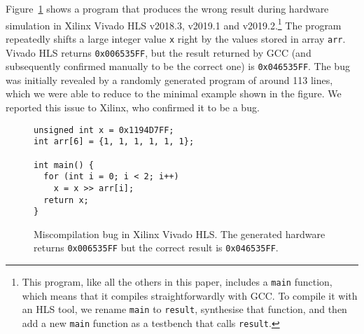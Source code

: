 \begin{example}
\label{ex:vivado_miscomp}
Figure~\ref{fig:vivado_bug1} shows a program that produces the wrong result
during hardware simulation in Xilinx Vivado HLS v2018.3, v2019.1 and
v2019.2.\footnote{This program, like all the others in this paper, includes a
  \texttt{main} function, which means that it compiles straightforwardly with
  GCC. To compile it with an HLS tool, we rename \texttt{main} to
  \texttt{result}, synthesise that function, and then add a new \texttt{main}
  function as a testbench that calls \texttt{result}.} The program repeatedly
shifts a large integer value \texttt{x} right by the values stored in array
\texttt{arr}.  Vivado HLS returns \texttt{0x006535FF}, but the result returned
by GCC (and subsequently confirmed manually to be the correct one) is
\texttt{0x046535FF}. The bug was initially revealed by a randomly generated
program of around 113 lines, which we were able to reduce to the minimal example
shown in the figure.  We reported this issue to Xilinx, who confirmed it to be a
bug.
\end{example}

\begin{figure}
\centering
\begin{minipage}{6cm}
\begin{verbatim}
unsigned int x = 0x1194D7FF;
int arr[6] = {1, 1, 1, 1, 1, 1};

int main() {
  for (int i = 0; i < 2; i++)
    x = x >> arr[i];
  return x;
}
\end{verbatim}
\end{minipage}
\caption[Miscompilation bug in Xilinx Vivado HLS v2018.3, v2019.1 and
v2019.2.]{Miscompilation bug in Xilinx Vivado HLS. The generated hardware
  returns \texttt{0x006535FF} but the correct result is \texttt{0x046535FF}.}%
\label{fig:vivado_bug1}
\end{figure}

\def\totaltestcases{6700}
\def\totaltestcasefailures{1191}
\def\numuniquebugs{8}
\def\vivadotestcases{3645}

